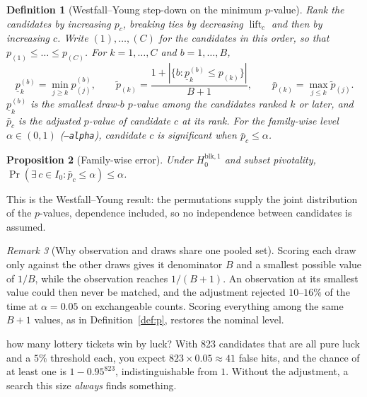 \documentclass[11pt,a4paper]{article}
\newtheorem{definition}{Definition}[section]
\newtheorem{proposition}[definition]{Proposition}
\theoremstyle{remark}
\newtheorem{remark}[definition]{Remark}
\newcommand{\lift}{\operatorname{lift}}
\newcommand{\minp}{\underline{p}}
\begin{document}
\begin{definition}[Westfall--Young step-down on the minimum $p$-value]
\label{def:wy}
Rank the candidates by increasing $p_c$, breaking ties by decreasing
$\lift_c$ and then by increasing $c$. Write $(1),\dots,(C)$ for the candidates
in this order, so that $p_{(1)}\le\dots\le p_{(C)}$. For $k=1,\dots,C$ and
$b=1,\dots,B$,
\[
  \minp^{(b)}_k=\min_{j\ge k}p^{(b)}_{(j)},\qquad
  \tilde p_{(k)}=\frac{1+|\{b:\minp^{(b)}_k\le p_{(k)}\}|}{B+1},\qquad
  \bar p_{(k)}=\max_{j\le k}\tilde p_{(j)}.
\]
$\minp^{(b)}_k$ is the smallest draw-$b$ $p$-value among the candidates ranked
$k$ or later, and $\bar p_c$ is the adjusted $p$-value of candidate $c$ at its
rank. For the family-wise level $\alpha\in(0,1)$ (\texttt{--alpha}),
candidate $c$ is \emph{significant} when $\bar p_c\le\alpha$.
\end{definition}

\begin{proposition}[Family-wise error]
\label{prop:fwer}
Under $H_0^{\mathrm{blk},1}$ and subset pivotality,
$\Pr(\exists\, c\in I_0:\bar p_c\le\alpha)\le\alpha$.
\end{proposition}

This is the Westfall--Young result: the permutations supply the joint
distribution of the $p$-values, dependence included, so no independence
between candidates is assumed.

\begin{remark}[Why observation and draws share one pooled set]
Scoring each draw only against the other draws gives it denominator $B$ and a
smallest possible value of $1/B$, while the observation reaches $1/(B+1)$. An
observation at its smallest value could then never be matched, and the
adjustment rejected $10$--$16\%$ of the time at $\alpha=0.05$ on exchangeable
counts. Scoring everything among the same $B+1$ values, as in
Definition~\ref{def:p}, restores the nominal level.
\end{remark}

\begin{example}{how many lottery tickets win by luck?}
With 823 candidates that are all pure luck and a $5\%$ threshold each, you
expect $823\times0.05\approx41$ false hits, and the chance of at least one is
$1-0.95^{823}$, indistinguishable from $1$. Without the adjustment, a search
this size \emph{always} finds something.
\end{example}
\end{document}

